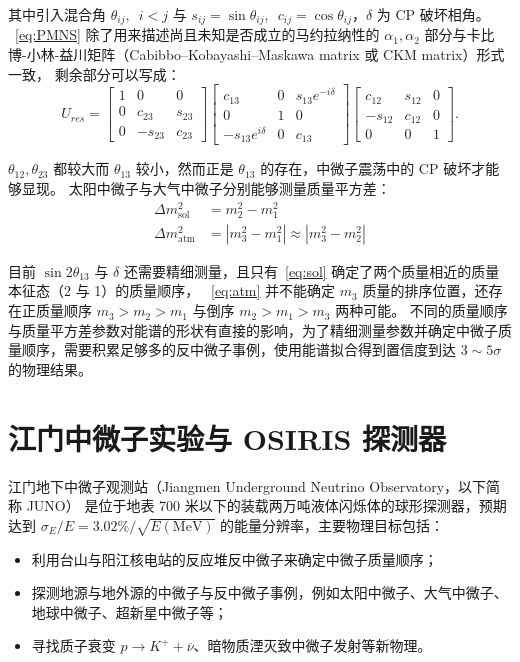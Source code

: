 其中引入混合角 $\theta_{ij},\enspace i<j$ 与 $s_{ij}=\sin{\theta_{ij}},\enspace c_{ij}=\cos{\theta_{ij}}$，$\delta$ 为 CP 破坏相角。
~\eqref{eq:PMNS} 除了用来描述尚且未知是否成立的马约拉纳性的 $\alpha_1,\alpha_2$ 部分与卡比博-小林-益川矩阵（Cabibbo–Kobayashi–Maskawa matrix 或 CKM matrix）形式一致，
剩余部分可以写成：
\begin{equation}
    U_{res}=
    \begin{bmatrix}
    1&0&0\\0&c_{23}&s_{23}\\0&-s_{23}&c_{23}
    \end{bmatrix}
    \begin{bmatrix}
    c_{13}&0&s_{13}e^{-i\delta}\\0&1&0\\-s_{13}e^{i\delta}&0&c_{13}
    \end{bmatrix}
    \begin{bmatrix}
    c_{12}&s_{12}&0\\-s_{12}&c_{12}&0\\0&0&1
    \end{bmatrix}.
\end{equation}

$\theta_{12},\theta_{23}$ 都较大而 $\theta_{13}$ 较小，然而正是 $\theta_{13}$ 的存在，中微子震荡中的 CP 破坏才能够显现。
太阳中微子与大气中微子分别能够测量质量平方差：
\begin{align}
    \Delta m_{\text{sol}}^2&=m_2^2-m_1^2\label{eq:sol}\\
    \Delta m_{\text{atm}}^2&=\left|m_3^2-m_1^2\right|\approx\left|m_3^2-m_2^2\right|\label{eq:atm}
\end{align}

目前 $\sin{2\theta_{13}}$ 与 $\delta$ 还需要精细测量，且只有~\eqref{eq:sol} 确定了两个质量相近的质量本征态（2 与 1）的质量顺序，
~\eqref{eq:atm} 并不能确定 $m_3$ 质量的排序位置，还存在正质量顺序 $m_3>m_2>m_1$ 与倒序 $m_2>m_1>m_3$ 两种可能。
不同的质量顺序与质量平方差参数对能谱的形状有直接的影响，为了精细测量参数并确定中微子质量顺序，需要积累足够多的反中微子事例，使用能谱拟合得到置信度到达 $3\sim5\sigma$ 的物理结果。

\section{江门中微子实验与 OSIRIS 探测器}\label{sec:osiris}
江门地下中微子观测站（Jiangmen Underground Neutrino Observatory，以下简称 JUNO）\cite{JUNOPhysicsDetector2022}
是位于地表 700 米以下的装载两万吨液体闪烁体的球形探测器，预期达到 $\sigma_E/E=3.02\%/\sqrt{E(\text{MeV})}$ 的能量分辨率，主要物理目标包括：
\begin{itemize}
    \item 利用台山与阳江核电站的反应堆反中微子来确定中微子质量顺序；
    \item 探测地源与地外源的中微子与反中微子事例，例如太阳中微子、大气中微子、地球中微子、超新星中微子等；
    \item 寻找质子衰变 $p\rightarrow K^{+}+\overline{\nu}$、暗物质湮灭致中微子发射等新物理。
\end{itemize}

